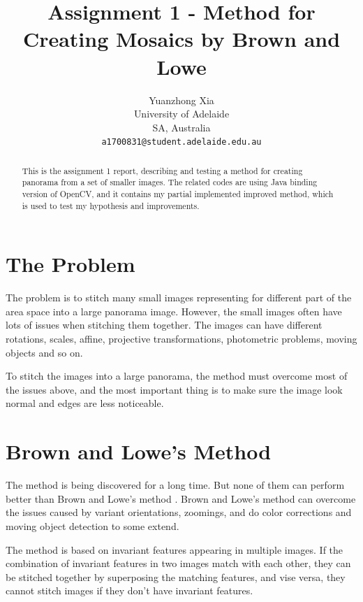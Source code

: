 \documentclass[10pt,twocolumn,letterpaper]{article}
\begin{document}
\title{Assignment 1 - Method for Creating Mosaics by Brown and Lowe}
\author{Yuanzhong Xia\\
University of Adelaide\\
SA, Australia\\
{\tt\small a1700831@student.adelaide.edu.au}
}
\maketitle

\begin{abstract}
This is the assignment 1 report, describing and testing a method for creating panorama from a set of smaller images.
The related codes are using Java binding version of OpenCV, and it contains my partial implemented improved method, which is used to test my hypothesis and improvements.
\end{abstract}


\section{The Problem}
The problem is to stitch many small images representing for different part of the area space into a large panorama image.
However, the small images often have lots of issues when stitching them together.
The images can have different rotations, scales, affine, projective transformations, photometric problems, moving objects and so on.

To stitch the images into a large panorama, the method must overcome most of the issues above,
and the most important thing is to make sure the image look normal and edges are less noticeable.


\section{Brown and Lowe's Method}
The method is being discovered for a long time. But none of them can perform better than Brown and Lowe's method \cite{origin}.
Brown and Lowe's method can overcome the issues caused by variant orientations, zoomings, and do color corrections and moving object detection to some extend.

The method is based on invariant features appearing in multiple images. If the combination of invariant features in two images match with each other,
they can be stitched together by superposing the matching features, and vise versa, they cannot stitch images if they don't have invariant features. 
\end{document}

